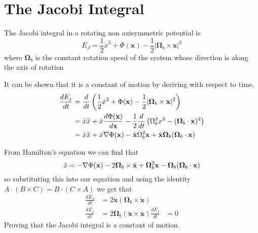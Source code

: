 \section{The Jacobi Integral}
The Jacobi integral in a rotating non axisymmetric potential is 
\begin{equation}
    E_J=\frac{1}{2}\Dot{x}^2 + \Phi(\mathbf{x}) - \frac{1}{2}\left|\mathbf{\Omega}_b \times \mathbf{x}\right|^2
\end{equation}
where $\mathbf{\Omega}_b$ is the constant rotation speed of the system whose direction is along the axis of rotation

It can be shown that it is a constant of motion by deriving with respect to time,
\begin{align*}
     \frac{dE_j}{dt}&=\frac{d}{dt}\left(\frac{1}{2}\Dot{x}^2 
     +\Phi(\mathbf{x}) 
     -\frac{1}{2}|\mathbf{\Omega}_b\times\mathbf{x}|^2\right)\\
     &=\Dot{x}\Ddot{x}+\Dot{x}\frac{d\Phi(\mathbf{x})}{d\mathbf{x}}-\frac{1}{2}\frac{d}{dt}\left(\Omega_b^2x^2 - (\mathbf{\Omega}_b\cdot\mathbf{x})^2\right)\\
     &=\Dot{x}\Ddot{x}+\Dot{x}\nabla\Phi(\mathbf{x})-\dot{\mathbf{x}}\Omega_b^2\mathbf{x}+ 
     \dot{\mathbf{x}}\mathbf{\Omega}_b(\mathbf{\Omega}_b\cdot\mathbf{x})\\
\end{align*}

From Hamilton's equation we can find that 
\begin{equation}
    \Ddot{x}=-\nabla\Phi(\mathbf{x})-2\mathbf{\Omega}_b\times\dot{\mathbf{x}}+\mathbf{\Omega}_b^2\mathbf{x}-\mathbf{\Omega}_b(\mathbf{\Omega}_b\cdot\mathbf{x})
\end{equation}
so substituting this into our equation and using the identity $A\cdot(B\times C)=B\cdot(C\times A)$ we get that
\begin{align*}
    \frac{dE_J}{dt}&=2\dot{\mathbf{x}}\left(\mathbf{\Omega}_b\times\dot{\mathbf{x}}\right)\\
    \frac{dE_j}{dt}&=2\mathbf{\Omega}_b\left(\dot{\mathbf{x}}\times\dot{\mathbf{x}}\right)
    \frac{dE_j}{dt}&=0
\end{align*}
Proving that the Jacobi integral is a constant of motion.

